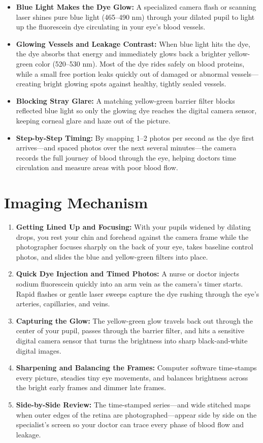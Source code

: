 \begin{itemize}
    \item \textbf{Blue Light Makes the Dye Glow:} A specialized camera flash or scanning laser shines pure blue light (465--490 nm) through your dilated pupil to light up the fluorescein dye circulating in your eye's blood vessels.
    \item \textbf{Glowing Vessels and Leakage Contrast:} When blue light hits the dye, the dye absorbs that energy and immediately glows back a brighter yellow-green color (520--530 nm). Most of the dye rides safely on blood proteins, while a small free portion leaks quickly out of damaged or abnormal vessels---creating bright glowing spots against healthy, tightly sealed vessels.
    \item \textbf{Blocking Stray Glare:} A matching yellow-green barrier filter blocks reflected blue light so only the glowing dye reaches the digital camera sensor, keeping corneal glare and haze out of the picture.
    \item \textbf{Step-by-Step Timing:} By snapping 1--2 photos per second as the dye first arrives---and spaced photos over the next several minutes---the camera records the full journey of blood through the eye, helping doctors time circulation and measure areas with poor blood flow.
\end{itemize}

\section{Imaging Mechanism}

\begin{enumerate}
    \item \textbf{Getting Lined Up and Focusing:} With your pupils widened by dilating drops, you rest your chin and forehead against the camera frame while the photographer focuses sharply on the back of your eye, takes baseline control photos, and slides the blue and yellow-green filters into place.
    \item \textbf{Quick Dye Injection and Timed Photos:} A nurse or doctor injects sodium fluorescein quickly into an arm vein as the camera's timer starts. Rapid flashes or gentle laser sweeps capture the dye rushing through the eye's arteries, capillaries, and veins.
    \item \textbf{Capturing the Glow:} The yellow-green glow travels back out through the center of your pupil, passes through the barrier filter, and hits a sensitive digital camera sensor that turns the brightness into sharp black-and-white digital images.
    \item \textbf{Sharpening and Balancing the Frames:} Computer software time-stamps every picture, steadies tiny eye movements, and balances brightness across the bright early frames and dimmer late frames.
    \item \textbf{Side-by-Side Review:} The time-stamped series---and wide stitched maps when outer edges of the retina are photographed---appear side by side on the specialist's screen so your doctor can trace every phase of blood flow and leakage.
\end{enumerate}

